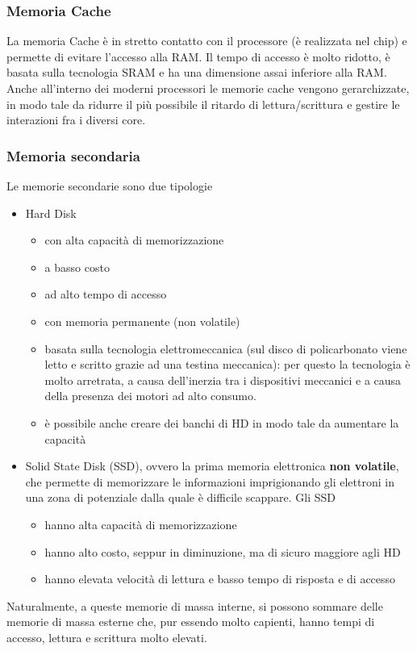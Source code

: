 \documentclass[a4paper]{extarticle}
\begin{document}
\vspace{1em}
\subsubsection{Memoria Cache}
La memoria Cache è in stretto contatto con il processore (è realizzata nel chip) e permette di evitare l'accesso alla RAM. Il tempo di accesso è molto ridotto, è basata sulla tecnologia SRAM e ha una dimensione assai inferiore alla RAM.\\
Anche all'interno dei moderni processori le memorie cache vengono gerarchizzate, in modo tale da ridurre il più possibile il ritardo di lettura/scrittura e gestire le interazioni fra i diversi core.

\vspace{1em}
\subsubsection{Memoria secondaria}
Le memorie secondarie sono due tipologie
\begin{itemize}
    \item Hard Disk
    \begin{itemize}
        \item con alta capacità di memorizzazione
        \item a basso costo
        \item ad alto tempo di accesso
        \item con memoria permanente (non volatile)
        \item basata sulla tecnologia elettromeccanica (sul disco di policarbonato viene letto e scritto grazie ad una testina meccanica): per questo la tecnologia è molto arretrata, a causa dell'inerzia tra i dispositivi meccanici e a causa della presenza dei motori ad alto consumo.
        \item è possibile anche creare dei banchi di HD in modo tale da aumentare la capacità
    \end{itemize}

    \item Solid State Disk (SSD), ovvero la prima memoria elettronica \textbf{non volatile}, che permette di memorizzare le informazioni imprigionando gli elettroni in una zona di potenziale dalla quale è difficile scappare. Gli SSD
    \begin{itemize}
        \item hanno alta capacità di memorizzazione
        \item hanno alto costo, seppur in diminuzione, ma di sicuro maggiore agli HD
        \item hanno elevata velocità di lettura e basso tempo di risposta e di accesso
    \end{itemize}
\end{itemize}
Naturalmente, a queste memorie di massa interne, si possono sommare delle memorie di massa esterne che, pur essendo molto capienti, hanno tempi di accesso, lettura e scrittura molto elevati.
\end{document}
